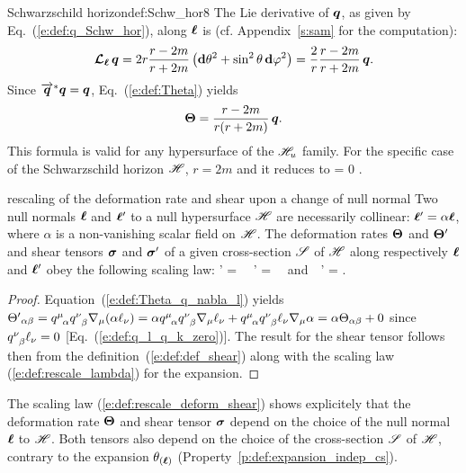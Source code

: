 \begin{texample}{Schwarzschild horizon}{def:Schw_hor8}
The Lie derivative of $\bm{q}$, as given by Eq.~(\ref{e:def:q_Schw_hor}),
along $\bm{\ell}$ is (cf. Appendix~\ref{s:sam} for the computation):
\[
    \bm{\mathcal{L}}_{\bm{\bm{\ell}}}\, \bm{q} =  2 r \frac{r-2m}{r+2m} \left( \mathbf{d}\theta^2
        +  \sin^2\theta \, \mathbf{d}\varphi^2 \right) = \frac{2}{r} \frac{r-2m}{r+2m}
            \, \bm{q} .
\]
Since $\overrightarrow{\bm{q}}^* \bm{q} = \bm{q}$, Eq.~(\ref{e:def:Theta}) yields
\[
    \bm{\Theta} = \frac{r-2m}{r(r+2m)} \, \bm{q} .
\]
This formula is valid for any hypersurface of the $\mathscr{H}_u$ family. For the specific
case of the Schwarzschild horizon $\mathscr{H}$, $r=2m$ and it reduces to
\be \label{e:def:Theta_zero_Schw_hor}
    \w{\Theta} = 0 .
\ee
\end{texample}

\begin{tprop}{rescaling of the deformation rate and shear upon a change of null normal}{}
Two null normals $\bm{\ell}$ and $\bm{\ell}'$ to a null hypersurface $\mathscr{H}$ are necessarily collinear:
$\bm{\ell}' = \alpha \bm{\ell}$, where $\alpha$ is a non-vanishing scalar field on $\mathscr{H}$.
The deformation rates $\bm{\Theta}$ and $\bm{\Theta}'$ and shear tensors
$\bm{\sigma}$ and $\bm{\sigma}'$ of a given cross-section $\mathscr{S}$
of $\mathscr{H}$ along respectively $\bm{\ell}$ and $\bm{\ell}'$ obey the following scaling law:
\be \label{e:def:rescale_deform_shear}
   \wl' = \alpha \wl \ \Longrightarrow \ \w{\Theta}' = \alpha \w{\Theta}
   \ \ \mbox{and}\  \ \w{\sigma}' = \alpha \w{\sigma} .
\ee
\end{tprop}

\begin{proof}
Equation~(\ref{e:def:Theta_q_nabla_l}) yields
${\Theta'}_{\alpha\beta}  = q^\mu_{\ \, \alpha} q^\nu_{\ \, \beta} \nabla_\mu (\alpha \ell_\nu) =
\alpha q^\mu_{\ \, \alpha} q^\nu_{\ \, \beta} \nabla_\mu \ell_\nu
+ q^\mu_{\ \, \alpha} q^\nu_{\ \, \beta} \ell_\nu \nabla_\mu \alpha = \alpha \Theta_{\alpha\beta} + 0$
since $q^\nu_{\ \, \beta} \ell_\nu = 0$ [Eq.~(\ref{e:def:q_l_q_k_zero})].
The result for the shear tensor follows then from the definition~(\ref{e:def:def_shear}) along
with the scaling law (\ref{e:def:rescale_lambda}) for the expansion.
\end{proof}

\begin{remark}
\label{r:def:shear_dep_cs}
The scaling law (\ref{e:def:rescale_deform_shear}) shows explicitely that the deformation rate $\bm{\Theta}$
and shear tensor $\bm{\sigma}$ depend on the choice of the null normal $\bm{\ell}$ to $\mathscr{H}$.
Both tensors also depend on the choice of the cross-section $\mathscr{S}$ of $\mathscr{H}$,
contrary to the expansion $\theta_{(\bm{\ell})}$ (Property~\ref{p:def:expansion_indep_cs}).
\end{remark}

